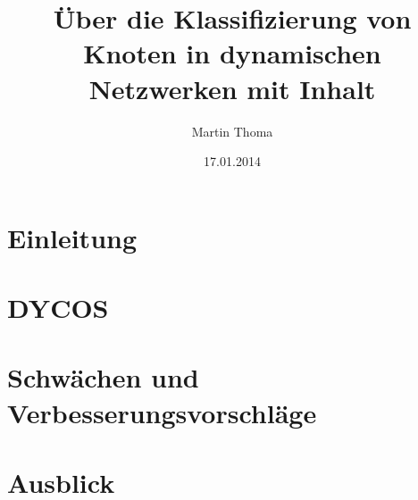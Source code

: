 \documentclass[runningheads]{llncs}
\begin{document}
\mainmatter
\title{Über die Klassifizierung von Knoten in dynamischen Netzwerken mit Inhalt}
\author{Martin Thoma}
\date{17.01.2014}
\maketitle

\begin{abstract}%

\end{abstract}
\clearpage

\section{Einleitung}


\section{DYCOS}


\section{Schwächen und Verbesserungsvorschläge}


\section{Ausblick}


%


\end{document}
